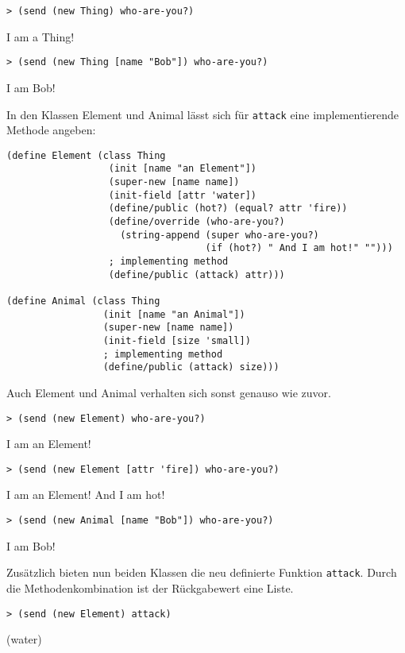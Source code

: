 \begin{lstlisting}
> (send (new Thing) who-are-you?)
\end{lstlisting}
{\routput {\qq}I am a Thing!\qq}

\begin{lstlisting}
> (send (new Thing [name "Bob"]) who-are-you?)
\end{lstlisting}
{\routput {\qq}I am Bob!\qq}

In den Klassen Element und Animal lässt sich für \texttt{attack} eine implementierende Methode angeben:

\begin{lstlisting}
(define Element (class Thing 
                  (init [name "an Element"])
                  (super-new [name name])
                  (init-field [attr 'water])
                  (define/public (hot?) (equal? attr 'fire))
                  (define/override (who-are-you?)
                    (string-append (super who-are-you?)
                                   (if (hot?) " And I am hot!" "")))
                  ; implementing method
                  (define/public (attack) attr)))
                  
(define Animal (class Thing
                 (init [name "an Animal"])
                 (super-new [name name])
                 (init-field [size 'small])
                 ; implementing method
                 (define/public (attack) size)))
\end{lstlisting}

Auch Element und Animal verhalten sich sonst genauso wie zuvor.

\begin{lstlisting}
> (send (new Element) who-are-you?)
\end{lstlisting}
{\routput {\qq}I am an Element!\qq}

\begin{lstlisting}
> (send (new Element [attr 'fire]) who-are-you?)
\end{lstlisting}
{\routput {\qq}I am an Element! And I am hot!\qq}

\begin{lstlisting}
> (send (new Animal [name "Bob"]) who-are-you?)
\end{lstlisting}
{\routput {\qq}I am Bob!\qq}

Zusätzlich bieten nun beiden Klassen die neu definierte Funktion \texttt{attack}. Durch die Methodenkombination ist der Rückgabewert eine Liste.

\begin{lstlisting}
> (send (new Element) attack)
\end{lstlisting}
{\rsymbol (water)}

